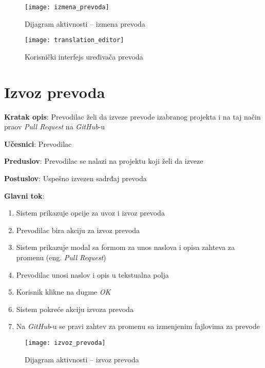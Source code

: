 \begin{figure}[H]
    \centering
    \texttt{[image: izmena\_prevoda]}
    \caption{Dijagram aktivnosti -- izmena prevoda}
\end{figure}

\begin{figure}[H]
    \centering
    \texttt{[image: translation\_editor]}
    \caption{Korisnički interfejs uređivača prevoda}
\end{figure}


\section{Izvoz prevoda}

\textbf{Kratak opis}: Prevodilac želi da izveze prevode izabranog projekta i 
na taj način praov \textit{Pull Request} na \textit{GitHub}-u

\textbf{Učesnici}: Prevodilac

\textbf{Preduslov}: Prevodilac se nalazi na projektu koji želi da izveze

\textbf{Postuslov}: Uspešno izvezen sadrđaj prevoda

\textbf{Glavni tok}:
\begin{enumerate}
    \item Sistem prikazuje opcije za uvoz i izvoz prevoda
    \item Prevodilac bira akciju za izvoz prevoda
    \item Sistem prikazuje modal sa formom za unos naslova i opisa 
    zahteva za promenu (eng. \textit{Pull Request})
    \item Prevodilac unosi naslov i opis u tekstualna polja
    \item Korisnik klikne na dugme \textit{OK}
    \item Sistem pokreće akciju izvoza prevoda
    \item Na \textit{GitHub}-u se pravi zahtev za promenu sa izmenjenim fajlovima za prevode
\end{enumerate}

\begin{figure}[H]
    \centering
    \texttt{[image: izvoz\_prevoda]}
    \caption{Dijagram aktivnosti -- izvoz prevoda}
\end{figure}
